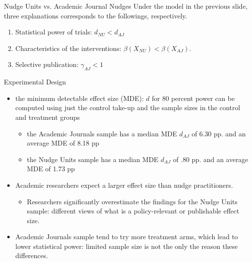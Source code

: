 \documentclass[dvipdfmx,11pt]{beamer}
\begin{document}
\begin{frame}{Nudge Units vs. Academic Journal Nudges}
  Under the model in the previous slide, three explanations corresponds to the followings, respectively.
  \begin{enumerate}
    \item Statistical power of trials: $d_{NU} < d_{AJ}$
    \item Characteristics of the interventions: $\beta(X_{NU}) < \beta(X_{AJ})$.
    \item Selective publication: $\gamma_{AJ} < 1$
  \end{enumerate}
\end{frame}

\begin{frame}{Experimental Design}
  \begin{itemize}
    \item the minimum detectable effect size (MDE): $d$ for 80 percent power can be computed using just the control take-up and the sample sizes in the control and treatment groups
    \begin{itemize}
      \item the Academic Journals sample has a median MDE $d_{AJ}$ of 6.30 pp. and an average MDE of 8.18 pp
      \item the Nudge Units sample has a median MDE $d_{AJ}$ of .80 pp. and an average MDE of 1.73 pp
    \end{itemize}
    \item Academic researchers expect a larger effect size than nudge practitioners.
    \begin{itemize}
      \item Researchers significantly overestimate the findings for the Nudge Units sample: different views of what is a policy-relevant or publishable effect size.
    \end{itemize}
    \item Academic Journals sample tend to try more treatment arms, which lead to lower statistical power: limited sample size is not the only the reason these differences.
  \end{itemize}
\end{frame}
\end{document}
